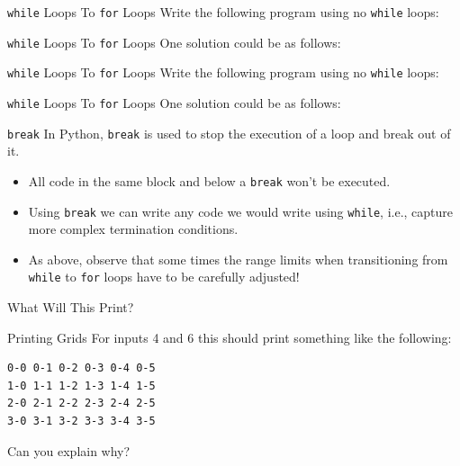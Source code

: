 \documentclass[aspectratio=169, 12pt, xcolor=table]{beamer}
\begin{document}
	\begin{frame}{\texttt{while} Loops To \texttt{for} Loops}
		Write the following program using no \texttt{while} loops:
		
	\end{frame}

	\begin{frame}{\texttt{while} Loops To \texttt{for} Loops}
		One solution could be as follows:
		
	\end{frame}

	\begin{frame}{\texttt{while} Loops To \texttt{for} Loops}
		Write the following program using no \texttt{while} loops:
		
	\end{frame}

	\begin{frame}{\texttt{while} Loops To \texttt{for} Loops}
		One solution could be as follows:
		
	\end{frame}

	\begin{frame}{\texttt{break}}
		In Python, \texttt{break} is used to stop the execution of a loop and break out of it.
		\begin{itemize}
			\item All code in the same block and below a \texttt{break} won't be executed.
			\item Using \texttt{break} we can write any code we would write using \texttt{while}, i.e., capture more complex termination conditions.
			\item As above, observe that some times the range limits when transitioning from \texttt{while} to \texttt{for} loops have to be carefully adjusted!
		\end{itemize}
	\end{frame}

	\begin{frame}{What Will This Print?}
		
	\end{frame}

	\begin{frame}[fragile]{Printing Grids}
		For inputs 4 and 6 this should print something like the following:
		\begin{verbatim}
0-0 0-1 0-2 0-3 0-4 0-5 
1-0 1-1 1-2 1-3 1-4 1-5 
2-0 2-1 2-2 2-3 2-4 2-5 
3-0 3-1 3-2 3-3 3-4 3-5
\end{verbatim}
		Can you explain why?
	\end{frame}
\end{document}
